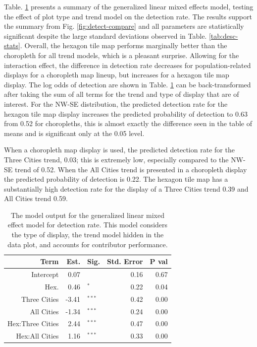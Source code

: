 \documentclass[journal]{vgtc}                     %
\begin{document}
Table. \ref{tab:detect-glmer1} presents a summary of the generalized linear mixed effects model, testing the effect of plot type and trend model on the detection rate. The results support the summary from Fig. \ref{fig:detect-compare} and all parameters are statistically significant despite the large standard deviations observed in Table. \ref{tab:desc-stats}. Overall, the hexagon tile map performs marginally better than the choropleth for all trend models, which is a pleasant surprise. Allowing for the interaction effect, the difference in detection rate decreases for population-related displays for a choropleth map lineup, but increases for a hexagon tile map display.
The log odds of detection are shown in Table. \ref{tab:detect-glmer1} can be back-transformed after taking the sum of all terms for the trend and type of display that are of interest.
For the NW-SE distribution, the predicted detection rate for the hexagon tile map display increases the predicted probability of detection to 0.63 from 0.52 for choropleths, this is almost exactly the difference seen in the table of means and is significant only at the 0.05 level.

When a choropleth map display is used, the predicted detection rate for the Three Cities trend, 0.03; this is extremely low, especially compared to the NW-SE trend of 0.52.
When the All Cities trend is presented in a choropleth display the predicted probability of detection is 0.22.
The hexagon tile map has a substantially high detection rate for the display of a Three Cities trend 0.39 and All Cities trend 0.59.

\begin{table}[h]

\caption{\label{tab:detect-glmer1}The model output for the generalized linear mixed effect model for detection rate. This model considers the type of display, the trend model hidden in the data plot, and accounts for contributor performance.}
\centering
\begin{tabular}[t]{rrlrr}
\toprule
Term & Est. & Sig. & Std. Error & P val\\
\midrule
Intercept & 0.07 & $^{ }$ & 0.16 & 0.67\\
Hex. & 0.46 & $^{*}$ & 0.22 & 0.04\\
\addlinespace
Three Cities & -3.41 & $^{***}$ & 0.42 & 0.00\\
All Cities & -1.34 & $^{***}$ & 0.24 & 0.00\\
\addlinespace
Hex:Three Cities & 2.44 & $^{***}$ & 0.47 & 0.00\\
Hex:All Cities & 1.16 & $^{***}$ & 0.33 & 0.00\\
\bottomrule
\end{tabular}
\end{table}
\end{document}
